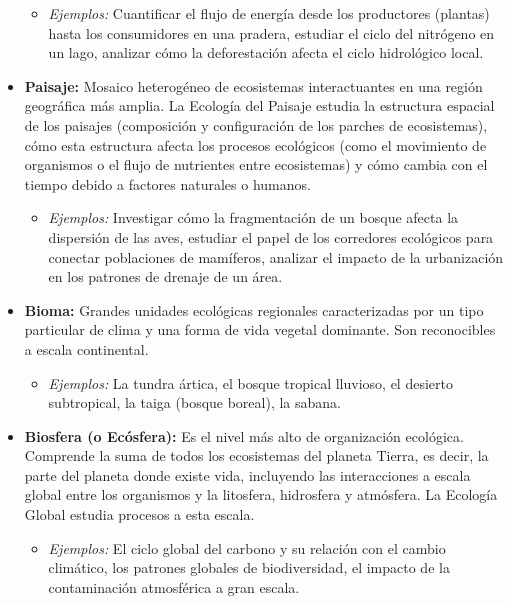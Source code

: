 \documentclass[
]{book}
\providecommand{\tightlist}{%
  \setlength{\itemsep}{0pt}\setlength{\parskip}{0pt}}
\begin{document}
\begin{itemize}
  \begin{itemize}
  \tightlist
  \item
    \emph{Ejemplos:} Cuantificar el flujo de energía desde los productores (plantas) hasta los consumidores en una pradera, estudiar el ciclo del nitrógeno en un lago, analizar cómo la deforestación afecta el ciclo hidrológico local.
  \end{itemize}
\item
  \textbf{Paisaje:} Mosaico heterogéneo de ecosistemas interactuantes en una región geográfica más amplia. La Ecología del Paisaje estudia la estructura espacial de los paisajes (composición y configuración de los parches de ecosistemas), cómo esta estructura afecta los procesos ecológicos (como el movimiento de organismos o el flujo de nutrientes entre ecosistemas) y cómo cambia con el tiempo debido a factores naturales o humanos.

  \begin{itemize}
  \tightlist
  \item
    \emph{Ejemplos:} Investigar cómo la fragmentación de un bosque afecta la dispersión de las aves, estudiar el papel de los corredores ecológicos para conectar poblaciones de mamíferos, analizar el impacto de la urbanización en los patrones de drenaje de un área.
  \end{itemize}
\item
  \textbf{Bioma:} Grandes unidades ecológicas regionales caracterizadas por un tipo particular de clima y una forma de vida vegetal dominante. Son reconocibles a escala continental.

  \begin{itemize}
  \tightlist
  \item
    \emph{Ejemplos:} La tundra ártica, el bosque tropical lluvioso, el desierto subtropical, la taiga (bosque boreal), la sabana.
  \end{itemize}
\item
  \textbf{Biosfera (o Ecósfera):} Es el nivel más alto de organización ecológica. Comprende la suma de todos los ecosistemas del planeta Tierra, es decir, la parte del planeta donde existe vida, incluyendo las interacciones a escala global entre los organismos y la litosfera, hidrosfera y atmósfera. La Ecología Global estudia procesos a esta escala.

  \begin{itemize}
  \tightlist
  \item
    \emph{Ejemplos:} El ciclo global del carbono y su relación con el cambio climático, los patrones globales de biodiversidad, el impacto de la contaminación atmosférica a gran escala.
  \end{itemize}
\end{itemize}
\end{document}
